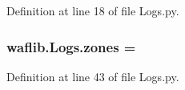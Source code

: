 Definition at line 18 of file Logs.\+py.

\subsubsection[{\texorpdfstring{zones}{zones}}]{ waflib.\+Logs.\+zones = \textquotesingle{}\textquotesingle{}}\hypertarget{namespacewaflib_1_1_logs_aba9794a0b8c3714be5f6b71f6a9c5192}{}\label{namespacewaflib_1_1_logs_aba9794a0b8c3714be5f6b71f6a9c5192}


Definition at line 43 of file Logs.\+py.

